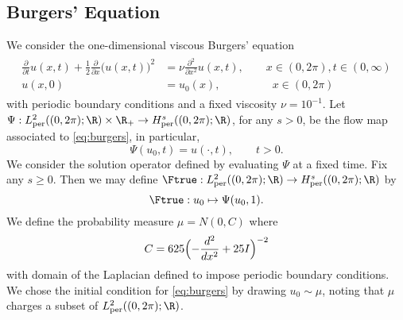 \iffalse
The coefficients $a$ are generated according to \(a \sim \mu \) where \(\mu = \psi_{\#} \mathcal{N}(0,(-\Delta + 9I)^{-2})\)
with a Neumann boundry condition on the operator \(-\Delta + 9I\) and $f(x)$ is fixed.
The mapping \(\psi : \R \to \R\) takes the value $12$ on the positive part of the real line and $3$ on the negative. Such constructions are prototypical models for many physical systems such as permeability in sub-surface flows and material microstructures in elasticity. Solutions \(u\) are obtained by using a second-order finite difference scheme on $241 \times 241$ and $421 \times 421$ grids. Different resolutions are downsampled from this dataset. 
Without specific notice, the number of training data is set to be $1000$; the number of testing data to be $100$.
For this problem we want to learn the operator for the coefficient function $a$ to the solution function $u$:
\[\Ftrue: a \mapsto u\]
\fi


\subsection{Burgers' Equation}
\label{ssec:burgers}
We consider the one-dimensional viscous Burgers' equation
\begin{align}
    \label{eq:burgers}
    \begin{split}
    \frac{\partial}{\partial t} u(x,t) + \frac{1}{2} \frac{\partial}{\partial x} \bigl ( u(x,t) \bigl)^2 &= \nu \frac{\partial^2}{\partial x^2} u(x,t), \qquad x \in (0,2\pi), t \in (0,\infty) \\
    u(x,0) &= u_0(x), \qquad \qquad \:\:\: x \in (0,2\pi)
    \end{split}
\end{align}
with periodic boundary conditions and a fixed viscosity \(\nu = 10^{-1}\). Let \(\Psi : L^2_{\text{per}}((0,2\pi);\R) \times \R_+ \to H^s_{\text{per}}((0,2\pi);\R)\), for any \(s > 0\), be the flow map associated to \eqref{eq:burgers}, in particular,
\[\Psi(u_0, t) = u(\cdot,t), \qquad t > 0.\]
We consider the solution operator defined by evaluating \(\Psi\) at a fixed time. Fix any $s \ge 0.$ Then we may define \(\Ftrue : L^2_{\text{per}}((0,2\pi);\R) \to H^s_{\text{per}}((0,2\pi);\R)\) by
\begin{equation}
    \label{eq:burgerssolutionop}
    \Ftrue : u_0 \mapsto \Psi(u_0,1).
\end{equation}
We define the probability measure \(\mu = N(0,C)\) where
\[C = 625 \Bigl ( -\frac{d^2}{dx^2} + 25I \Bigl)^{-2}\]
with domain of the Laplacian defined to impose periodic boundary conditions. We chose the initial condition for \eqref{eq:burgers} by drawing \(u_0 \sim \mu\), noting that \(\mu\) charges a subset of \(L^2_{\text{per}}((0,2\pi);\R)\).

